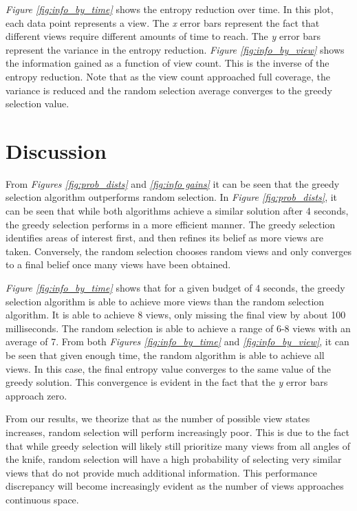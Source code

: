 \documentclass[letterpaper, 10 pt, conference]{ieeeconf}  %
\begin{document}
\textit{Figure \ref{fig:info_by_time}} shows the entropy reduction over time. In this plot, each data point represents a view. The \textit{x} error bars represent the fact that different views require different amounts of time to reach. The \textit{y} error bars represent the variance in the entropy reduction. \textit{Figure \ref{fig:info_by_view}} shows the information gained as a function of view count. This is the inverse of the entropy reduction. Note that as the view count approached full coverage, the variance is reduced and the random selection average converges to the greedy selection value.

\section{Discussion}

From \textit{Figures \ref{fig:prob_dists}} and \textit{\ref{fig:info gains}} it can be seen that the greedy selection algorithm outperforms random selection. In \textit{Figure \ref{fig:prob_dists}}, it can be seen that while both algorithms achieve a similar solution after 4 seconds, the greedy selection performs in a more efficient manner. The greedy selection identifies areas of interest first, and then refines its belief as more views are taken. Conversely, the random selection chooses random views and only converges to a final belief once many views have been obtained.

\textit{Figure \ref{fig:info_by_time}} shows that for a given budget of 4 seconds, the greedy selection algorithm is able to achieve more views than the random selection algorithm. It is able to achieve 8 views, only missing the final view by about 100 milliseconds. The random selection is able to achieve a range of 6-8 views with an average of 7. From both \textit{Figures \ref{fig:info_by_time}} and \textit{\ref{fig:info_by_view}}, it can be seen that given enough time, the random algorithm is able to achieve all views. In this case, the final entropy value converges to the same value of the greedy solution. This convergence is evident in the fact that the \textit{y} error bars approach zero.

From our results, we theorize that as the number of possible view states increases, random selection will perform increasingly poor. This is due to the fact that while greedy selection will likely still prioritize many views from all angles of the knife, random selection will have a high probability of selecting very similar views that do not provide much additional information. This performance discrepancy will become increasingly evident as the number of views approaches continuous space.
\end{document}
